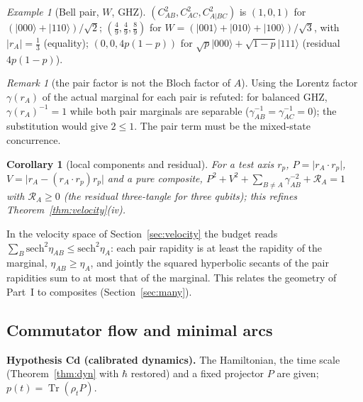 \documentclass[aps,pra,onecolumn,superscriptaddress,nofootinbib,10pt]{revtex4-2}
\newtheorem{corollary}[theorem]{Corollary}
\theoremstyle{definition}
\theoremstyle{remark}
\newtheorem{remark}[theorem]{Remark}
\newtheorem{example}[theorem]{Example}
\newcommand{\tr}{\operatorname{Tr}}
\begin{document}
\begin{example}[Bell pair, $W$, GHZ]\label{ex:bdbudget}
$(C_{AB}^2,C_{AC}^2,C_{A|BC}^2)$ is $(1,0,1)$ for $(\lvert000\rangle+\lvert110\rangle)/\sqrt2$; $(\tfrac49,\tfrac49,\tfrac89)$ for $W=(\lvert001\rangle+\lvert010\rangle+\lvert100\rangle)/\sqrt3$, with $\lvert r_A\rvert=\tfrac13$ (equality);
$(0,0,4p(1-p))$ for $\sqrt p\lvert000\rangle+\sqrt{1-p}\lvert111\rangle$ (residual $4p(1-p)$).
\end{example}

\begin{remark}[the pair factor is not the Bloch factor of $A$]\label{rem:bdghz}
Using the Lorentz factor $\gamma(r_A)$ of the actual marginal for each pair is refuted: for balanced GHZ, $\gamma(r_A)^{-1}=1$
while both pair marginals are separable ($\gamma_{AB}^{-1}=\gamma_{AC}^{-1}=0$); the substitution would give $2\le1$.  The pair term must be the
mixed-state concurrence.
\end{remark}

\begin{corollary}[local components and residual]\label{cor:bdlocal}
For a test axis $r_p$, $P=\lvert r_A\cdot r_p\rvert$, $V=\lvert r_A-(r_A\cdot r_p)r_p\rvert$ and a pure composite, $P^2+V^2+\sum_{B\ne A}\gamma_{AB}^{-2}+\mathcal R_A=1$ with $\mathcal R_A\ge0$ (the residual
three-tangle for three qubits); this refines Theorem~\ref{thm:velocity}(iv).
\end{corollary}
\noindent In the velocity space of Section~\ref{sec:velocity} the budget reads $\sum_B\mathrm{sech}^2\eta_{AB}\le\mathrm{sech}^2\eta_A$: each pair rapidity is at least the
rapidity of the marginal, $\eta_{AB}\ge\eta_A$, and jointly the squared hyperbolic secants of the pair rapidities sum to at
most that of the marginal.
This relates the geometry of Part~I to composites (Section~\ref{sec:many}).

\subsection{Commutator flow and minimal arcs}\label{sec:bdrates}

\smallskip\noindent\textbf{Hypothesis Cd (calibrated dynamics).}  The Hamiltonian, the time scale (Theorem~\ref{thm:dyn} with $\hbar$
restored) and a fixed projector $P$ are given; $p(t)=\tr(\rho_tP)$.
\end{document}
